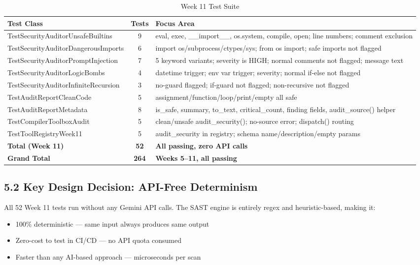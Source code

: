 \documentclass[a4paper,11pt]{article}
\begin{document}
\begin{table}[h]
\centering
\begin{tabularx}{\textwidth}{|l|c|X|}
\hline
\rowcolor{red!10}
\textbf{Test Class} & \textbf{Tests} & \textbf{Focus Area} \\
\hline
TestSecurityAuditorUnsafeBuiltins & 9 & eval, exec, \_\_import\_\_, os.system, compile, open; line numbers; comment exclusion \\
\hline
TestSecurityAuditorDangerousImports & 6 & import os/subprocess/ctypes/sys; from os import; safe imports not flagged \\
\hline
TestSecurityAuditorPromptInjection & 7 & 5 keyword variants; severity is HIGH; normal comments not flagged; message text \\
\hline
TestSecurityAuditorLogicBombs & 4 & datetime trigger; env var trigger; severity; normal if-else not flagged \\
\hline
TestSecurityAuditorInfiniteRecursion & 3 & no-guard flagged; if-guard not flagged; non-recursive not flagged \\
\hline
TestAuditReportCleanCode & 5 & assignment/function/loop/print/empty all safe \\
\hline
TestAuditReportMetadata & 8 & is\_safe, summary, to\_text, critical\_count, finding fields, audit\_source() helper \\
\hline
TestCompilerToolboxAudit & 5 & clean/unsafe audit\_security(); no-source error; dispatch() routing \\
\hline
TestToolRegistryWeek11 & 5 & audit\_security in registry; schema name/description/empty params \\
\hline
\textbf{Total (Week 11)} & \textbf{52} & \textbf{All passing, zero API calls} \\
\hline
\textbf{Grand Total} & \textbf{264} & \textbf{Weeks 5--11, all passing} \\
\hline
\end{tabularx}
\caption{Week 11 Test Suite}
\end{table}

\subsection{5.2 Key Design Decision: API-Free Determinism}

All 52 Week 11 tests run without any Gemini API calls. The SAST engine is entirely regex and heuristic-based, making it:
\begin{itemize}
    \item 100\% deterministic — same input always produces same output
    \item Zero-cost to test in CI/CD — no API quota consumed
    \item Faster than any AI-based approach — microseconds per scan
\end{itemize}
\end{document}
